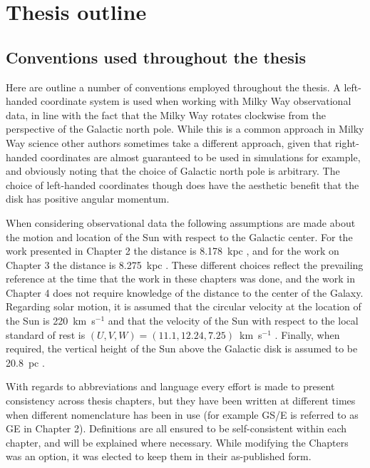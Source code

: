 \section{Thesis outline}



\subsection{Conventions used throughout the thesis}

Here are outline a number of conventions employed throughout the thesis. A left-handed coordinate system is used when working with Milky Way observational data, in line with the fact that the Milky Way rotates clockwise from the perspective of the Galactic north pole. While this is a common approach in Milky Way science other authors sometimes take a different approach, given that right-handed coordinates are almost guaranteed to be used in simulations for example, and obviously noting that the choice of Galactic north pole is arbitrary. The choice of left-handed coordinates though does have the aesthetic benefit that the disk has positive angular momentum.

When considering observational data the following assumptions are made about the motion and location of the Sun with respect to the Galactic center. For the work presented in Chapter 2 the distance is 8.178~kpc \parencite{gravity19}, and for the work on Chapter 3 the distance is 8.275~kpc \parencite{gravity21}. These different choices reflect the prevailing reference at the time that the work in these chapters was done, and the work in Chapter 4 does not require knowledge of the distance to the center of the Galaxy. Regarding solar motion, it is assumed that the circular velocity at the location of the Sun is 220~km~s$^{-1}$ and that the velocity of the Sun with respect to the local standard of rest is $(U,V,W) = (11.1,12.24,7.25)$~km~s$^{-1}$ \parencite{schoenrich10}. Finally, when required, the vertical height of the Sun above the Galactic disk is assumed to be 20.8~pc \parencite{bennett19}.

With regards to abbreviations and language every effort is made to present consistency across thesis chapters, but they have been written at different times when different nomenclature has been in use (for example GS/E is referred to as GE in Chapter 2). Definitions are all ensured to be self-consistent within each chapter, and will be explained where necessary. While modifying the Chapters was an option, it was elected to keep them in their as-published form.

